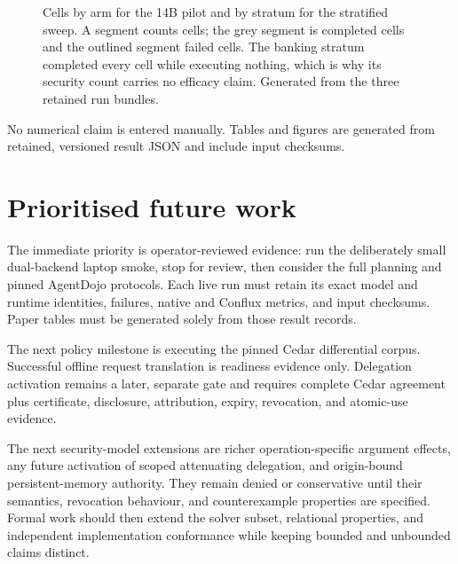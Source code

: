 \documentclass[11pt]{article}
\begin{document}
\begin{figure}[t]
\centering

\caption{Cells by arm for the 14B pilot and by stratum for the stratified sweep. A
segment counts cells; the grey segment is completed cells and the outlined segment
failed cells. The banking stratum completed every cell while executing nothing, which
is why its security count carries no efficacy claim. Generated from the three retained
run bundles.}
\label{fig:runpod-cells}
\end{figure}













No numerical claim is entered manually. Tables and figures are generated from
retained, versioned result JSON and include input checksums.

\section{Prioritised future work}

The immediate priority is operator-reviewed evidence: run the deliberately
small dual-backend laptop smoke, stop for review, then consider the full
planning and pinned AgentDojo protocols. Each live run must retain its exact
model and runtime identities, failures, native and Conflux metrics, and input
checksums. Paper tables must be generated solely from those result records.

The next policy milestone is executing the pinned Cedar differential corpus.
Successful offline request translation is readiness evidence only. Delegation
activation remains a later, separate gate and requires complete Cedar agreement
plus certificate, disclosure, attribution, expiry, revocation, and atomic-use
evidence.

The next security-model extensions are richer operation-specific argument
effects, any future activation of scoped attenuating delegation, and
origin-bound persistent-memory authority. They remain denied or conservative
until their semantics, revocation behaviour, and counterexample properties are
specified. Formal work should then extend
the solver subset, relational properties, and independent implementation
conformance while keeping bounded and unbounded claims distinct.
\end{document}
